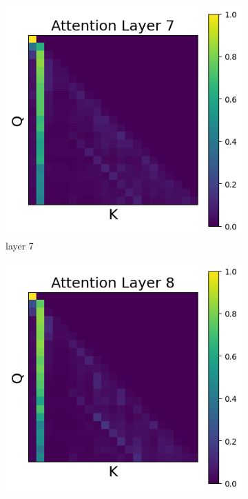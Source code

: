\documentclass[11pt]{article}
\begin{document}
\begin{figure}[t]
    \begin{subfigure}[t]{0.24\textwidth}
    \centering
    \includegraphics[width=1.4\columnwidth]{figures/intervention3/layer_7.png}
    \caption{layer 7}
  \end{subfigure}\hfill
      \begin{subfigure}[t]{0.24\textwidth}
    \centering
    \includegraphics[width=1.4\columnwidth]{figures/intervention3/layer_8.png}

\end{subfigure}
\end{figure}
\end{document}
